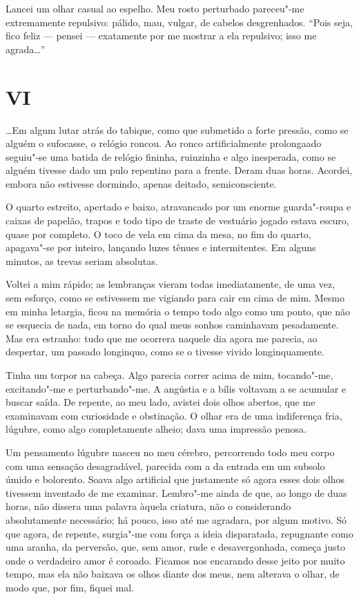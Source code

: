 Lancei um olhar casual ao espelho. Meu rosto perturbado pareceu"-me
extremamente repulsivo: pálido, mau, vulgar, de cabelos desgrenhados.
``Pois seja, fico feliz --- pensei --- exatamente por me mostrar a ela
repulsivo; isso me agrada\ldots{}''

\section{VI}

\ldots{}Em algum lutar atrás do tabique, como que submetido a forte pressão,
como se alguém o sufocasse, o relógio roncou. Ao ronco artificialmente
prolongaado seguiu"-se uma batida de relógio fininha, ruinzinha e algo
inesperada, como se alguém tivesse dado um pulo repentino para a frente.
Deram duas horas. Acordei, embora não estivesse dormindo, apenas
deitado, semiconsciente.

O quarto estreito, apertado e baixo, atravancado por um enorme
guarda"-roupa e caixas de papelão, trapos e todo tipo de traste de
vestuário jogado estava escuro, quase por completo. O toco de vela em
cima da mesa, no fim do quarto, apagava"-se por inteiro, lançando luzes
tênues e intermitentes. Em alguns minutos, as trevas seriam absolutas.

Voltei a mim rápido; as lembranças vieram todas imediatamente, de uma
vez, sem esforço, como se estivessem me vigiando para cair em cima de
mim. Mesmo em minha letargia, ficou na memória o tempo todo algo como um
ponto, que não se esquecia de nada, em torno do qual meus sonhos
caminhavam pesadamente. Mas era estranho: tudo que me ocorrera naquele
dia agora me parecia, ao despertar, um passado longinquo, como se o
tivesse vivido longinquamente.

Tinha um torpor na cabeça. Algo parecia correr acima de mim, tocando"-me,
excitando"-me e perturbando"-me. A angústia e a bílis voltavam a se
acumular e buscar saída. De repente, ao meu lado, avistei dois olhos
abertos, que me examinavam com curiosidade e obstinação. O olhar era de
uma indiferença fria, lúgubre, como algo completamente alheio; dava uma
impressão penosa.

Um pensamento lúgubre nasceu no meu cérebro, percorrendo todo meu corpo
com uma sensação desagradável, parecida com a da entrada em um subsolo
úmido e bolorento. Soava algo artificial que justamente só agora esses
dois olhos tivessem inventado de me examinar. Lembro"-me ainda de que, ao
longo de duas horas, não dissera uma palavra àquela criatura, não o
considerando absolutamente necessário; há pouco, isso até me agradara,
por algum motivo. Só que agora, de repente, surgia"-me com força a ideia
disparatada, repugnante como uma aranha, da perversão, que, sem amor,
rude e desavergonhada, começa justo onde o verdadeiro amor é coroado.
Ficamos nos encarando desse jeito por muito tempo, mas ela não baixava
os olhos diante dos meus, nem alterava o olhar, de modo que, por fim,
fiquei mal.

